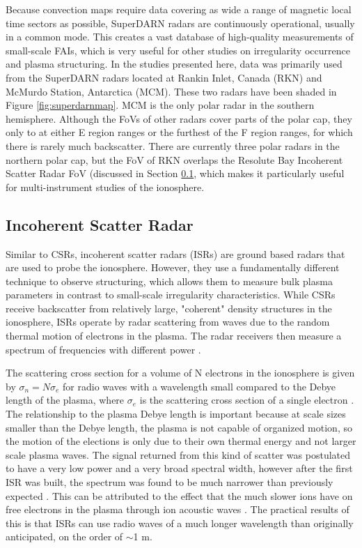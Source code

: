 Because convection maps require data covering as wide a range of magnetic local time sectors as possible, SuperDARN radars are continuously operational, usually in a common mode.  This creates a vast database of high-quality measurements of small-scale FAIs, which is very useful for other studies on irregularity occurrence and plasma structuring.  In the studies presented here, data was primarily used from the SuperDARN radars located at Rankin Inlet, Canada (RKN) and McMurdo Station, Antarctica (MCM).  These two radars have been shaded in Figure \ref{fig:superdarnmap}.  MCM is the only polar radar in the southern hemisphere.  Although the FoVs of other radars cover parts of the polar cap, they only to at either E region ranges or the furthest of the F region ranges, for which there is rarely much backscatter.  There are currently three polar radars in the northern polar cap, but the FoV of RKN overlaps the Resolute Bay Incoherent Scatter Radar FoV (discussed in Section \ref{sec:isr}, which makes it particularly useful for multi-instrument studies of the ionosphere.

\subsection{Incoherent Scatter Radar}
\label{sec:isr}
Similar to CSRs, incoherent scatter radars (ISRs) are ground based radars that are used to probe the ionosphere.  However, they use a fundamentally different technique to observe structuring, which allows them to measure bulk plasma parameters in contrast to small-scale irregularity characteristics.  While CSRs receive backscatter from relatively large, "coherent" density structures in the ionosphere, ISRs operate by radar scattering from waves due to the random thermal motion of electrons in the plasma.  The radar receivers then measure a spectrum of frequencies with different power \citep{Gordon1958}.

The scattering cross section for a volume of N electrons in the ionosphere is given by \(\sigma_n = N \sigma_e\) for radio waves with a wavelength small compared to the Debye length of the plasma, where \(\sigma_e\) is the scattering cross section of a single electron \citep{Gordon1958,Fejer1960}.  The relationship to the plasma Debye length is important because at scale sizes smaller than the Debye length, the plasma is not capable of organized motion, so the motion of the elections is only due to their own thermal energy and not larger scale plasma waves.  The signal returned from this kind of scatter was postulated to have a very low power and a very broad spectral width, however after the first ISR was built, the spectrum was found to be much narrower than previously expected \citep{Evans1969}.  This can be attributed to the effect that the much slower ions have on free electrons in the plasma through ion acoustic waves \citep{Bowles1958}.  The practical results of this is that ISRs can use radio waves of a much longer wavelength than originally anticipated, on the order of \(\sim\)1 m.

